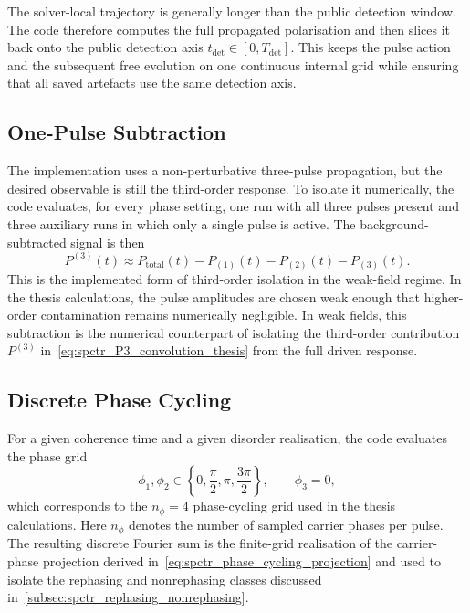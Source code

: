 The solver-local trajectory is generally longer than the public detection
window. The code therefore computes the full propagated polarisation and then
slices it back onto the public detection axis
\(t_{\mathrm{det}} \in [0,T_{\mathrm{det}}]\). This keeps the pulse action and
the subsequent free evolution on one continuous internal grid while ensuring
that all saved artefacts use the same detection axis.

\subsection{One-Pulse Subtraction}

The implementation uses a non-perturbative three-pulse propagation, but the
desired observable is still the third-order response. To isolate it
numerically, the code evaluates, for every phase setting, one run with all
three pulses present and three auxiliary runs in which only a single pulse is
active. The background-subtracted signal is then
\begin{equation}
\label{eq:third_order_signal_numerical}
P^{(3)}(t)
\approx
P_{\mathrm{total}}(t)
- P_{(1)}(t)
- P_{(2)}(t)
- P_{(3)}(t).
\end{equation}
This is the implemented form of third-order isolation in the weak-field
regime. In the thesis calculations, the pulse amplitudes are chosen weak
enough that higher-order contamination remains numerically negligible. In weak
fields, this subtraction is the numerical counterpart of isolating the
third-order contribution \(P^{(3)}\)
in~\autoref{eq:spctr_P3_convolution_thesis} from the full driven response.

\subsection{Discrete Phase Cycling}

For a given coherence time and a given disorder realisation, the code evaluates
the phase grid
\[
\phi_1,\phi_2 \in
\left\{0,\frac{\pi}{2},\pi,\frac{3\pi}{2}\right\},
\qquad
\phi_3 = 0,
\]
which corresponds to the \(n_{\phi}=4\) phase-cycling grid used in the thesis
calculations. Here \(n_{\phi}\) denotes the number of sampled carrier phases
per pulse. The resulting discrete Fourier sum is the finite-grid realisation of
the carrier-phase projection derived
in~\autoref{eq:spctr_phase_cycling_projection} and used to isolate the
rephasing and nonrephasing classes discussed
in~\autoref{subsec:spctr_rephasing_nonrephasing}.

